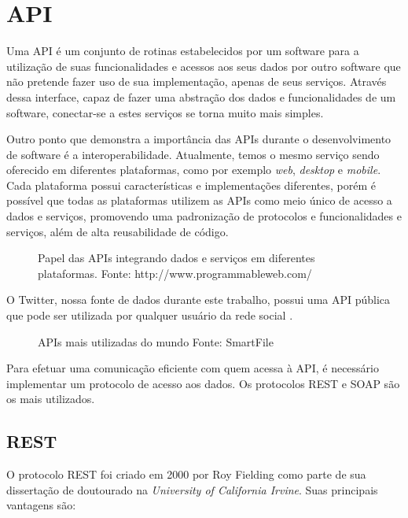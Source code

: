 \section{API}\label{sec:api}

Uma API é um conjunto de rotinas estabelecidos por um software para a utilização de suas funcionalidades e acessos aos seus dados por outro software que não pretende fazer uso de sua implementação, apenas de seus serviços. Através dessa interface, capaz de fazer uma abstração dos dados e funcionalidades de um software, conectar-se a estes serviços se torna muito mais simples.

Outro ponto que demonstra a importância das APIs durante o desenvolvimento de software é a interoperabilidade. Atualmente, temos o mesmo serviço sendo oferecido em diferentes plataformas, como por exemplo \textit{web}, \textit{desktop} e \textit{mobile}. Cada plataforma possui características e implementações diferentes, porém é possível que todas as plataformas utilizem as APIs como meio único de acesso a dados e serviços, promovendo uma padronização de protocolos e funcionalidades e serviços, além de alta reusabilidade de código.

\begin{figure}[H]
	\centering{}
	\caption{Papel das APIs integrando dados e serviços em diferentes plataformas. Fonte: http://www.programmableweb.com/}
	\label{uni}
\end{figure}

O Twitter, nossa fonte de dados durante este trabalho, possui uma API pública que pode ser utilizada por qualquer usuário da rede social \cite{twitterapidocs}. 

\begin{figure}[H]
	\centering{}
	\caption{APIs mais utilizadas do mundo Fonte: SmartFile}
	\label{uni}
\end{figure}

Para efetuar uma comunicação eficiente com quem acessa à API, é necessário implementar um protocolo de acesso aos dados. Os protocolos REST e SOAP são os mais utilizados.

\subsection{REST}
O protocolo REST foi criado em 2000 por Roy Fielding \cite{fieldingrest} como parte de sua dissertação de doutourado na \textit{University of California Irvine}. Suas principais vantagens são:

